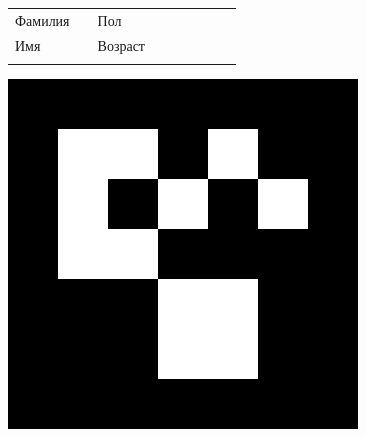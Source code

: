 \documentclass[12pt, a4paper]{article}
\begin{document}
\newpage

\renewcommand{\arraystretch}{1.5}

\begin{figure}[t]
\scriptsize 
\begin{tabular}[b]{ V{2.8} m{2.0cm} V{2.8} m{6.2cm} V{2.8} m{2cm} V{2.8} m{5.85cm} V{2.8} } 
Фамилия &  & Пол & \\  [0.45cm]
Имя &  & Возраст & \\  [0.45cm]

\end{tabular}
\includegraphics[scale=0.16]{imgs/marker_2699}
\end{figure}

\setlength{\textfloatsep}{5pt plus 1.0pt minus 1.0pt}
\end{document}

